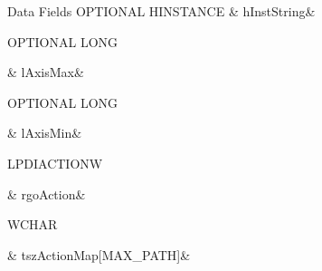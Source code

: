 \begin{DoxyFields}{Data Fields}
\hypertarget{a00003_af23659cd7790add805fab421d16090c9}{O\-P\-T\-I\-O\-N\-A\-L H\-I\-N\-S\-T\-A\-N\-C\-E}\label{a00003_af23659cd7790add805fab421d16090c9}
&
h\-Inst\-String&
\\
\hline

\hypertarget{a00003_abf71f27dd08ea4a40d16576705b92da5}{O\-P\-T\-I\-O\-N\-A\-L L\-O\-N\-G}\label{a00003_abf71f27dd08ea4a40d16576705b92da5}
&
l\-Axis\-Max&
\\
\hline

\hypertarget{a00003_ae03184d3b70774f29a59f1c589f3112e}{O\-P\-T\-I\-O\-N\-A\-L L\-O\-N\-G}\label{a00003_ae03184d3b70774f29a59f1c589f3112e}
&
l\-Axis\-Min&
\\
\hline

\hypertarget{a00003_a7e669360dc1e8e4c72cc7d10264cf6f2}{L\-P\-D\-I\-A\-C\-T\-I\-O\-N\-W}\label{a00003_a7e669360dc1e8e4c72cc7d10264cf6f2}
&
rgo\-Action&
\\
\hline

\hypertarget{a00003_a8fdf7c33ab4ccfe5715c06775d080d5b}{W\-C\-H\-A\-R}\label{a00003_a8fdf7c33ab4ccfe5715c06775d080d5b}
&
tsz\-Action\-Map\mbox{[}M\-A\-X\-\_\-\-P\-A\-T\-H\mbox{]}&
\\
\hline

\end{DoxyFields}
\label{d1/d22/a00057}
\hypertarget{a00003_d1/d22/a00057}{}
